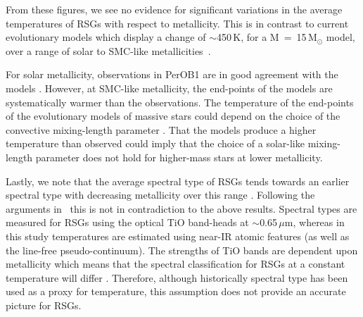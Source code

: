 From these figures, we see no evidence for significant variations in the average temperatures of RSGs with respect to metallicity.
This is in contrast to current evolutionary models which display a change of $\sim$450\,K,
for a M~=~15\,M$_{\odot}$ model,
over a range of solar to SMC-like metallicities~\citep{2012A&A...537A.146E,2013A&A...558A.103G}.

For solar metallicity, observations in PerOB1 are in good agreement with the models
\citep[see Figure 9 in][]{2014ApJ...788...58G}.
However, at SMC-like metallicity, the end-points of the models are systematically warmer than the observations.
The temperature of the end-points of the evolutionary models of massive stars could depend on the choice of the convective mixing-length parameter
\citep{1992A&AS...96..269S}.
That the models produce a higher temperature than observed could imply that the choice of a solar-like mixing-length parameter does not hold for higher-mass stars at lower metallicity.

Lastly, we note that the average spectral type of RSGs tends towards an earlier spectral type with decreasing metallicity over this range
\citep{1979ApJ...231..384H,2012AJ....144....2L}.
Following the arguments in~\citet{1979ApJ...231..384H} this is not in contradiction to the above results.
Spectral types are measured for RSGs using the optical TiO band-heads at
$\sim$0.65\,$\mu$m,
whereas in this study temperatures are estimated using near-IR atomic features
(as well as the line-free pseudo-continuum).
The strengths of TiO bands are dependent upon metallicity which means that
the spectral classification for RSGs at a constant temperature will differ
\citep{2013ApJ...767....3D}.
Therefore, although historically spectral type has been used as a proxy for temperature, this assumption does not provide an accurate picture for RSGs.


